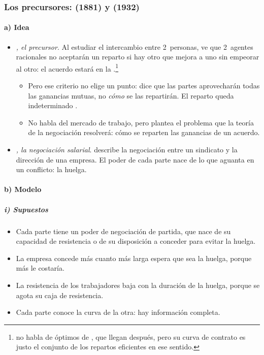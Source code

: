\documentclass[11pt]{article}
\begin{document}
\subsubsection{Los precursores:  (1881) y  (1932)}\label{sec:hicks}

\paragraph{a) Idea}

\begin{itemize}
\item \emph{, el precursor}. Al estudiar el intercambio entre 2~personas, \textcite{Edgeworth1881Mathematical} ve que 2~agentes racionales no aceptarán un reparto si hay otro que mejora a uno sin empeorar al otro: el acuerdo estará en la .\footnote{ no habla de óptimos de , que llegan después, pero su curva de contrato es justo el conjunto de los repartos eficientes en ese sentido.}
  \begin{itemize}
  \item Pero ese criterio no elige un punto: dice que las partes aprovecharán todas las ganancias mutuas, no \emph{cómo} se las repartirán. El reparto queda indeterminado .
  \item No habla del mercado de trabajo, pero plantea el problema que la teoría de la negociación resolverá: cómo se reparten las ganancias de un acuerdo.
  \end{itemize}
\item \emph{, la negociación salarial}. \textcite[cap.~VII]{Hicks1932Theory} describe la negociación entre un sindicato y la dirección de una empresa. El poder de cada parte nace de lo que aguanta en un conflicto: la huelga.
\end{itemize}

\paragraph{b) Modelo}

\subparagraph{i) Supuestos}

\begin{itemize}
\item Cada parte tiene un poder de negociación de partida, que nace de su capacidad de resistencia o de su disposición a conceder para evitar la huelga.
\item La empresa concede más cuanto más larga espera que sea la huelga, porque más le costaría.
\item La resistencia de los trabajadores baja con la duración de la huelga, porque se agota su caja de resistencia.
\item Cada parte conoce la curva de la otra: hay información completa.
\end{itemize}
\end{document}
